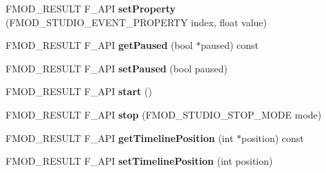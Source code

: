 \begin{DoxyCompactItemize}
\item 
\hypertarget{class_f_m_o_d_1_1_studio_1_1_event_instance_a36a3f227464e9781627c43609ae942d4}{F\+M\+O\+D\+\_\+\+R\+E\+S\+U\+L\+T F\+\_\+\+A\+P\+I {\bfseries set\+Property} (F\+M\+O\+D\+\_\+\+S\+T\+U\+D\+I\+O\+\_\+\+E\+V\+E\+N\+T\+\_\+\+P\+R\+O\+P\+E\+R\+T\+Y index, float value)}\label{class_f_m_o_d_1_1_studio_1_1_event_instance_a36a3f227464e9781627c43609ae942d4}

\item 
\hypertarget{class_f_m_o_d_1_1_studio_1_1_event_instance_a8e598977c7be3e60a5b41f0e47934a8c}{F\+M\+O\+D\+\_\+\+R\+E\+S\+U\+L\+T F\+\_\+\+A\+P\+I {\bfseries get\+Paused} (bool $\ast$paused) const }\label{class_f_m_o_d_1_1_studio_1_1_event_instance_a8e598977c7be3e60a5b41f0e47934a8c}

\item 
\hypertarget{class_f_m_o_d_1_1_studio_1_1_event_instance_a2ced2e548da2f1c448a760c27c1dd1fa}{F\+M\+O\+D\+\_\+\+R\+E\+S\+U\+L\+T F\+\_\+\+A\+P\+I {\bfseries set\+Paused} (bool paused)}\label{class_f_m_o_d_1_1_studio_1_1_event_instance_a2ced2e548da2f1c448a760c27c1dd1fa}

\item 
\hypertarget{class_f_m_o_d_1_1_studio_1_1_event_instance_a60147b932233cdd810a0b2f7449d7dae}{F\+M\+O\+D\+\_\+\+R\+E\+S\+U\+L\+T F\+\_\+\+A\+P\+I {\bfseries start} ()}\label{class_f_m_o_d_1_1_studio_1_1_event_instance_a60147b932233cdd810a0b2f7449d7dae}

\item 
\hypertarget{class_f_m_o_d_1_1_studio_1_1_event_instance_a46e1a1bdb3a429bf93dee3fded80703a}{F\+M\+O\+D\+\_\+\+R\+E\+S\+U\+L\+T F\+\_\+\+A\+P\+I {\bfseries stop} (F\+M\+O\+D\+\_\+\+S\+T\+U\+D\+I\+O\+\_\+\+S\+T\+O\+P\+\_\+\+M\+O\+D\+E mode)}\label{class_f_m_o_d_1_1_studio_1_1_event_instance_a46e1a1bdb3a429bf93dee3fded80703a}

\item 
\hypertarget{class_f_m_o_d_1_1_studio_1_1_event_instance_a484f64772a5dd4848482e07f5a736ed2}{F\+M\+O\+D\+\_\+\+R\+E\+S\+U\+L\+T F\+\_\+\+A\+P\+I {\bfseries get\+Timeline\+Position} (int $\ast$position) const }\label{class_f_m_o_d_1_1_studio_1_1_event_instance_a484f64772a5dd4848482e07f5a736ed2}

\item 
\hypertarget{class_f_m_o_d_1_1_studio_1_1_event_instance_a01a36712a315dbfc6a1459aea1160458}{F\+M\+O\+D\+\_\+\+R\+E\+S\+U\+L\+T F\+\_\+\+A\+P\+I {\bfseries set\+Timeline\+Position} (int position)}\label{class_f_m_o_d_1_1_studio_1_1_event_instance_a01a36712a315dbfc6a1459aea1160458}


\end{DoxyCompactItemize}
